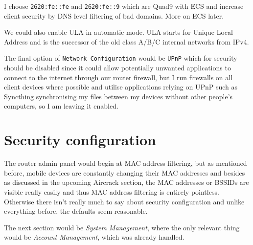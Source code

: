 \documentclass[../wifi-security.tex]{subfiles}
\begin{document}
I choose \texttt{2620:fe::fe} and \texttt{2620:fe::9} which are Quad9 with ECS and increase client security by DNS level filtering of bad domains. More on ECS later. %

We could also enable ULA in automatic mode. ULA starts for Unique Local Address and is the successor of the old class A/B/C internal networks from IPv4.

The final option of \texttt{Network Configuration} would be \texttt{UPnP} which for security should be disabled since it could allow potentially unwanted applications to connect to the internet through our router firewall, but I run firewalls on all client devices where possible and utilise applications relying on UPnP such as Syncthing synchronising my files between my devices without other people's computers, so I am leaving it enabled.

\section{Security configuration}

The router admin panel would begin at MAC address filtering, but as mentioned before, mobile devices are constantly changing their MAC addresses and besides as discussed in the upcoming Aircrack section, the MAC addresses or BSSIDs are visible really easily and thus MAC address filtering is entirely pointless. Otherwise there isn't really much to say about security configuration and unlike everything before, the defaults seem reasonable.

The next section would be \textit{System Management}, where the only relevant thing would be \textit{Account Management}, which was already handled.
\end{document}
